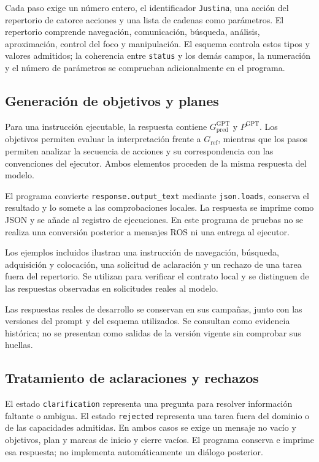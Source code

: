 Cada paso exige un número entero, el identificador \texttt{Justina},
una acción del repertorio de catorce acciones y una lista de cadenas
como parámetros. El repertorio comprende navegación, comunicación,
búsqueda, análisis, aproximación, control del foco y manipulación.
El esquema controla estos tipos y valores admitidos; la coherencia
entre \texttt{status} y los demás campos, la numeración y el número
de parámetros se comprueban adicionalmente en el programa.

\subsection{Generación de objetivos y planes}

Para una instrucción ejecutable, la respuesta contiene
\(G_{\mathrm{pred}}^{\mathrm{GPT}}\) y \(P^{\mathrm{GPT}}\).
Los objetivos permiten evaluar la interpretación frente a
\(G_{\mathrm{ref}}\), mientras que los pasos permiten analizar la
secuencia de acciones y su correspondencia con las convenciones del
ejecutor. Ambos elementos proceden de la misma respuesta del modelo.

El programa convierte \texttt{response.\allowbreak output\_\allowbreak text} mediante
\texttt{json.loads}, conserva el resultado y lo somete a las
comprobaciones locales. La respuesta se imprime como JSON y se añade
al registro de ejecuciones. En este programa de pruebas no se realiza
una conversión posterior a mensajes ROS ni una entrega al ejecutor.

Los ejemplos incluidos ilustran una instrucción de navegación,
búsqueda, adquisición y colocación, una solicitud de aclaración y un
rechazo de una tarea fuera del repertorio. Se utilizan para verificar
el contrato local y se distinguen de las respuestas observadas en
solicitudes reales al modelo.

Las respuestas reales de desarrollo se conservan en sus campañas, junto
con las versiones del prompt y del esquema utilizados. Se consultan como
evidencia histórica; no se presentan como salidas de la versión vigente
sin comprobar sus huellas.

\subsection{Tratamiento de aclaraciones y rechazos}

El estado \texttt{clarification} representa una pregunta para resolver
información faltante o ambigua. El estado \texttt{rejected} representa
una tarea fuera del dominio o de las capacidades admitidas. En ambos
casos se exige un mensaje no vacío y objetivos, plan y marcas de
inicio y cierre vacíos. El programa conserva e imprime esa respuesta;
no implementa automáticamente un diálogo posterior.

